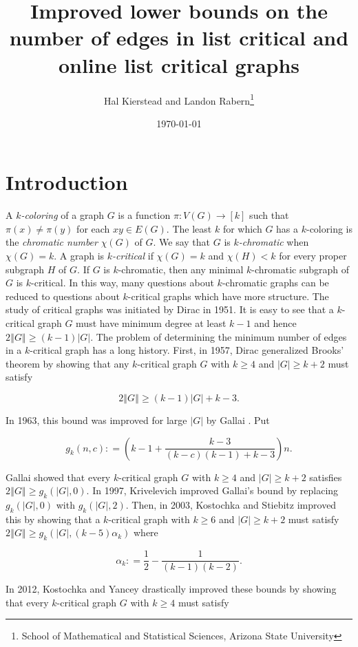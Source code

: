\documentclass[12pt]{article}
\title{Improved lower bounds on the number of edges in list critical and online list critical graphs}
\author{Hal Kierstead and Landon Rabern\thanks{School of Mathematical and Statistical Sciences, Arizona State University}}
\date{\today}
\theoremstyle{plain}
\theoremstyle{definition}
\theoremstyle{remark}
\newcommand{\card}[1]{\left|#1\right|}
\newcommand{\size}[1]{\left\Vert#1\right\Vert}
\newcommand{\func}[3]{#1\colon #2 \rightarrow #3}
\newcommand{\irange}[1]{\left[#1\right]}
\newcommand{\parens}[1]{\left( #1 \right)}
\newcommand{\DefinedAs}{\mathrel{\mathop:}=}
\begin{document}
\maketitle

\section{Introduction}
A \emph{$k$-coloring} of a graph $G$ is a function $\func{\pi}{V(G)}{\irange{k}}$ such that $\pi(x) \neq \pi(y)$ for each $xy \in E(G)$.  The least $k$ for which $G$ has a $k$-coloring is the \emph{chromatic number} $\chi(G)$ of $G$. We say that $G$ is \emph{$k$-chromatic} when $\chi(G) = k$.  A graph is \emph{$k$-critical} if $\chi(G) = k$ and $\chi(H) < k$ for every proper subgraph $H$ of $G$.  If $G$ is $k$-chromatic, then any minimal $k$-chromatic subgraph of $G$ is $k$-critical.  In this way, many questions about $k$-chromatic graphs can be reduced to questions about $k$-critical graphs which have more structure.  The study of critical graphs was initiated by Dirac \cite{dirac1951note} in 1951.  It is easy to see that a $k$-critical graph $G$ must have minimum degree at least $k-1$ and hence $2\size{G} \geq (k-1)\card{G}$.  The problem of determining the minimum number of edges in a $k$-critical graph has a long history. First, in 1957, Dirac \cite{dirac1957theorem} generalized Brooks' theorem \cite{brooks1941colouring} by showing that any $k$-critical graph $G$ with $k \geq 4$ and $\card{G} \geq k+2$ must satisfy 

\[2\size{G} \geq (k-1)\card{G} + k-3.\]

In 1963, this bound was improved for large $\card{G}$ by Gallai \cite{gallai1963kritische}.  Put 

\[g_k(n, c) \DefinedAs \parens{k-1 + \frac{k-3}{(k-c)(k-1) + k-3}}n.\]

Gallai showed that every $k$-critical graph $G$ with $k \geq 4$ and $\card{G} \geq k+2$ satisfies $2\size{G} \geq g_k(\card{G}, 0)$.  In 1997, Krivelevich \cite{krivelevich1997minimal} improved Gallai's bound by replacing $g_k(\card{G}, 0)$ with $g_k(\card{G}, 2)$.  Then, in 2003, Kostochka and Stiebitz \cite{kostochkastiebitzedgesincriticalgraph} improved this by showing that a $k$-critical graph with $k \geq 6$ and $\card{G} \geq k+2$ must satisfy $2\size{G} \geq g_k(\card{G}, (k-5)\alpha_k)$ where

\[\alpha_k \DefinedAs \frac12 - \frac{1}{(k-1)(k-2)}.\]

In 2012, Kostochka and Yancey \cite{kostochkayancey2012ore} drastically improved these bounds by showing that every $k$-critical graph $G$ with $k \geq 4$ must satisfy
\end{document}
